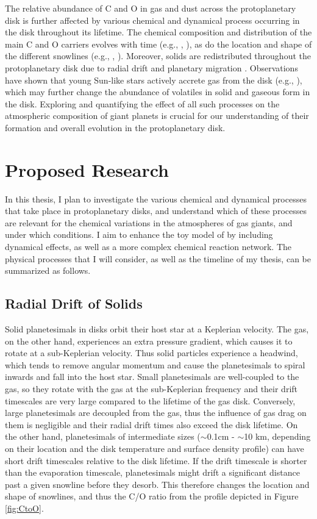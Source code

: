 \documentclass[manuscript]{aastex}
\begin{document}
The relative abundance of C and O in gas and dust across the protoplanetary disk is further affected by various chemical and dynamical process occurring in the disk throughout its lifetime. The chemical composition and distribution of the main C and O carriers evolves with time (e.g., \citealt{ciesla06}, \citealt{visser09}), as do the location and shape of the different snowlines (e.g., \citealt{garaud07}, \citealt{stevenson88}). Moreover, solids are redistributed throughout the protoplanetary disk due to radial drift \citep{chiang10} and planetary migration \citep{armitage10}. Observations have shown that young Sun-like stars actively accrete gas from the disk (e.g., \citealt{hartmann06}), which may further change the abundance of volatiles in solid and gaseous form in the disk. Exploring and quantifying the effect of all such processes on the atmospheric composition of giant planets is crucial for our understanding of their formation and overall evolution in the protoplanetary disk. 

\section{Proposed Research}

In this thesis, I plan to investigate the various chemical and dynamical processes that take place in protoplanetary disks, and understand which of these processes are relevant for the chemical variations in the atmospheres of gas giants, and under which conditions. I aim to enhance the toy model of \citet{oberg11} by including dynamical effects, as well as a more complex chemical reaction network. The physical processes that I will consider, as well as the timeline of my thesis, can be summarized as follows. 

\subsection{Radial Drift of Solids}
\label{sec:drift}

Solid planetesimals in disks orbit their host star at a Keplerian velocity. The gas, on the other hand, experiences an extra pressure gradient, which causes it to rotate at a sub-Keplerian velocity. Thus solid particles experience a headwind, which tends to remove angular momentum and cause the planetesimals to spiral inwards and fall into the host star. Small planetesimals are well-coupled to the gas, so they rotate with the gas at the sub-Keplerian frequency and their drift timescales are very large compared to the lifetime of the gas disk. Conversely, large planetesimals are decoupled from the gas, thus the influence of gas drag on them is negligible and their radial drift times also exceed the disk lifetime. On the other hand, planetesimals of intermediate sizes ($\sim$0.1cm - $\sim$10 km, depending on their location and the disk temperature and surface density profile) can have short drift timescales relative to the disk lifetime. If  the drift timescale is shorter than the evaporation timescale, planetesimals might drift a significant distance past a given snowline before they desorb. This therefore changes the location and shape of snowlines, and thus the C/O ratio from the profile depicted in Figure \ref{fig:CtoO}.
\end{document}
